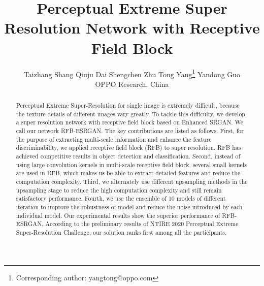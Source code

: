 \documentclass[10pt,twocolumn,letterpaper]{article}
\begin{document}
\title{Perceptual Extreme Super Resolution Network with Receptive Field Block}




\author{
\hspace{0mm}Taizhang Shang
\hspace{10mm}Qiuju Dai
\hspace{10mm}Shengchen Zhu
\hspace{10mm}Tong Yang\thanks{Corresponding author: yangtong@oppo.com}
\hspace{10mm}Yandong Guo
\vspace{1mm}
\\
OPPO Research, China
\\
}

\maketitle


\begin{abstract}
Perceptual Extreme Super-Resolution for single image is extremely difficult, because the texture details of different images vary greatly. To tackle this difficulty, we develop a super resolution network with receptive field block based on Enhanced SRGAN. We call our network RFB-ESRGAN. The key contributions are listed as follows. First, for the purpose of extracting multi-scale information and enhance the feature discriminability, we applied receptive field block (RFB) to super resolution. RFB has achieved competitive results in object detection and classification. Second, instead of using large convolution kernels in multi-scale receptive field block, several small kernels are used in RFB, which makes us be able to extract detailed features and reduce the computation complexity. Third, we alternately use different upsampling methods in the upsampling stage to reduce the high computation complexity and still remain satisfactory performance. Fourth, we use the ensemble of 10 models of different iteration to improve the robustness of model and reduce the noise introduced by each individual model. Our experimental results show the superior performance of RFB-ESRGAN. According to the preliminary results of NTIRE 2020 Perceptual Extreme Super-Resolution Challenge, our solution ranks first among all the participants.
\end{abstract}
\end{document}
